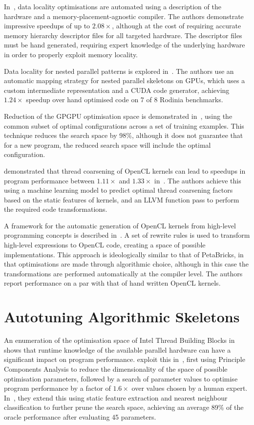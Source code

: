 In~\cite{Chen2014}, data locality optimisations are automated using a
description of the hardware and a memory-placement-agnostic
compiler. The authors demonstrate impressive speedups of up to
$2.08\times$, although at the cost of requiring accurate memory
hierarchy descriptor files for all targeted hardware. The descriptor
files must be hand generated, requiring expert knowledge of the
underlying hardware in order to properly exploit memory locality.

Data locality for nested parallel patterns is explored in~\cite{Lee}.
The authors use an automatic mapping strategy for nested parallel
skeletons on GPUs, which uses a custom intermediate representation and
a CUDA code generator, achieving $1.24\times$ speedup over hand
optimised code on 7 of 8 Rodinia benchmarks.

Reduction of the GPGPU optimisation space is demonstrated
in~\cite{Ryoo2008}, using the common subset of optimal configurations
across a set of training examples. This technique reduces the search
space by 98\%, although it does not guarantee that for a new program,
the reduced search space will include the optimal configuration.

\citeauthor{Magni2014} demonstrated that thread coarsening of OpenCL
kernels can lead to speedups in program performance between
$1.11\times$ and $1.33\times$ in~\cite{Magni2014}. The authors achieve
this using a machine learning model to predict optimal thread
coarsening factors based on the static features of kernels, and an
LLVM function pass to perform the required code transformations.

A framework for the automatic generation of OpenCL kernels from
high-level programming concepts is described in~\cite{Steuwer2015}. A
set of rewrite rules is used to transform high-level expressions to
OpenCL code, creating a space of possible implementations. This
approach is ideologically similar to that of PetaBricks, in that
optimisations are made through algorithmic choice, although in this
case the transformations are performed automatically at the compiler
level. The authors report performance on a par with that of hand
written OpenCL kernels.


\section{Autotuning Algorithmic Skeletons}

An enumeration of the optimisation space of Intel Thread Building
Blocks in~\cite{Contreras2008} shows that runtime knowledge of the
available parallel hardware can have a significant impact on program
performance. \citeauthor{Collins2012} exploit this
in~\cite{Collins2012}, first using Principle Components Analysis to
reduce the dimensionality of the space of possible optimisation
parameters, followed by a search of parameter values to optimise
program performance by a factor of $1.6\times$ over values chosen by a
human expert. In~\cite{Collins2013}, they extend this using static
feature extraction and nearest neighbour classification to further
prune the search space, achieving an average 89\% of the oracle
performance after evaluating 45 parameters.

